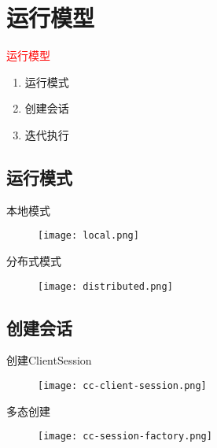 \section{运行模型}
\label{sec:exec-model}

\begin{frame}
  \begin{center}
    \Huge{\textcolor{red}{运行模型}}
  \end{center}

  \begin{enumerate}
    \item \alert{运行模式}
    \item \alert{创建会话}
    \item \alert{迭代执行}
  \end{enumerate}
\end{frame}

\subsection{运行模式}

\begin{frame}{本地模式}
  \begin{figure}
    \centering
    \texttt{[image: local.png]}
  \end{figure}
\end{frame}

\begin{frame}{分布式模式}
  \begin{figure}
    \centering
    \texttt{[image: distributed.png]}
  \end{figure}
\end{frame}

\subsection{创建会话}

\begin{frame}{创建ClientSession}
  \begin{figure}
    \centering
    \texttt{[image: cc-client-session.png]}
  \end{figure}
\end{frame}

\begin{frame}{多态创建}
  \begin{figure}
    \centering
    \texttt{[image: cc-session-factory.png]}
  \end{figure}
\end{frame}

